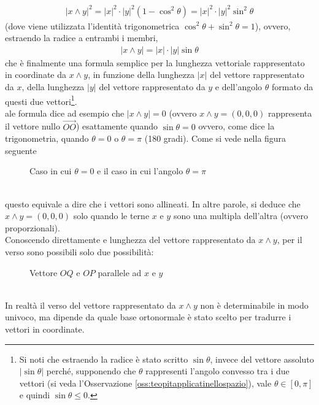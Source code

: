 \documentclass{book}
\newcommand{\abs}[1]{\lvert#1\rvert}
\theoremstyle{definition}
\theoremstyle{plain}
\begin{document}
  \begin{eqnarray*}
    \abs{x\wedge y}^2=\abs{x}^2\cdot\abs{y}^2(1-\cos^2\theta)=\abs{x}^2\cdot\abs{y}^2\sin^2\theta
  \end{eqnarray*}
  (dove viene utilizzata l'identità trigonometrica $\cos^2\theta+\sin^2\theta=1$), ovvero, estraendo la radice a entrambi i membri,
  \begin{eqnarray}
    \label{eq:teopitapplicatinellospazio15}
    \abs{x\wedge y}=\abs{x}\cdot\abs{y}\sin\theta
  \end{eqnarray}
  che è finalmente una formula semplice per la lunghezza vettoriale rappresentato in coordinate da $x\wedge y$, in funzione della lunghezza $\abs{x}$ del vettore rappresentato da $x$, della lunghezza $\abs{y}$ del vettore rappresentato da $y$ e dell'angolo $\theta$ formato da questi due vettori\footnote{Si noti che estraendo la radice è stato scritto $\sin\theta$, invece del vettore assoluto $\abs{\sin\theta}$ perché, supponendo che $\theta$ rappresenti l'angolo convesso tra i due vettori (si veda l'Osservazione \ref{oss:teopitapplicatinellospazio}), vale $\theta\in [0,\pi]$ e quindi $\sin \theta\leq 0$.}.\\ale formula dice ad esempio che $\abs{x\wedge y}=0$ (ovvero $x\wedge y=(0,0,0)$ rappresenta il vettore nullo $\vec{OO}$) esattamente quando $\sin\theta=0$ ovvero, come dice la trigonometria, quando $\theta=0$ o $\theta=\pi$ (180 gradi). Come si vede nella figura seguente
  \begin{figure}[ht!]
    \centering
    \resizebox{5cm}{!}{
      
    }
    \caption{Caso in cui $\theta=0$ e il caso in cui l'angolo $\theta = \pi$}
    \label{fig:theta0thetapi}
  \end{figure}\\
  questo equivale a dire che i vettori sono allineati. In altre parole, si deduce che $x\wedge y= (0,0,0)$ solo quando le terne $x$ e $y$ sono una multipla dell'altra (ovvero proporzionali).\\
  Conoscendo direttamente e lunghezza del vettore rappresentato da $x\wedge y$, per il verso sono possibili solo due possibilità:
  \begin{figure}[ht!]
    \centering
    \resizebox{5cm}{!}{
      
    }
    \caption{Vettore $OQ$ e $OP$ parallele ad $x$ e $y$}
    \label{fig:oqopparassinellospazio}
  \end{figure}\\
  In realtà il verso del vettore rappresentato da $x\wedge y$ non è determinabile in modo univoco, ma dipende da quale base ortonormale è stato scelto per tradurre i vettori in coordinate.
  
\end{document}
